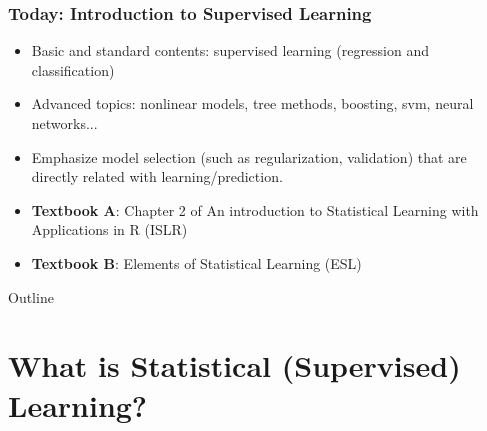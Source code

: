 \documentclass[10pt,a4paper]{beamer}
\begin{document}
\begin{frame}
	\frametitle{Today: Introduction to Supervised Learning}
	\begin{itemize}	 
	   	\item Basic and standard contents: supervised learning (regression and classification)
   		\item Advanced topics: nonlinear models, tree methods, boosting, svm, neural networks...
   		\item Emphasize model selection (such as regularization, validation) that are directly related with learning/prediction.	
		\item {\bf Textbook A}: Chapter 2 of An introduction to Statistical Learning with Applications in R (ISLR)		 
		\item {\bf Textbook B}: Elements of Statistical Learning (ESL)
	\end{itemize}
\end{frame}

\begin{frame}{Outline}
\tableofcontents
\end{frame}




\section{What is Statistical (Supervised) Learning?}
\end{document}
